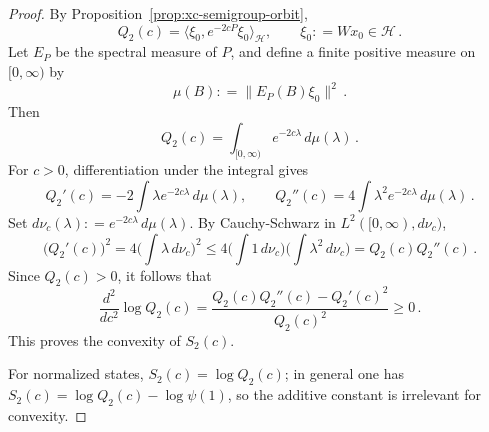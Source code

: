 \documentclass[11pt,a4paper]{article}
\theoremstyle{plain}
\numberwithin{theorem}{section}
\theoremstyle{definition}
\newcommand{\?}{\overset{?}{=}}
\newcommand{\defeq}{\mathrel{\mathop:}=}
\begin{document}
\begin{appendix}
\begin{proof}
By Proposition~\ref{prop:xc-semigroup-orbit},
\[
Q_2(c) = \langle \xi_0, e^{-2cP}\xi_0\rangle_{\mathcal H},
\qquad
\xi_0  \defeq  W x_0 \in \mathcal H\,. 
\]
Let \(E_P\) be the spectral measure of \(P\), and define a finite positive measure on
\([0,\infty)\) by
\[
\mu(B)  \defeq  \|E_P(B)\xi_0\|^2\,.
\]
Then
\[
Q_2(c)=\int_{[0,\infty)} e^{-2c\lambda}\,d\mu(\lambda)\,.
\]
For \(c>0\), differentiation under the integral gives
\[
Q_2'(c) = -2\int \lambda e^{-2c\lambda}\,d\mu(\lambda),
\qquad
Q_2''(c) = 4\int \lambda^2 e^{-2c\lambda}\,d\mu(\lambda)\,.
\]
Set \(d\nu_c(\lambda)  \defeq  e^{-2c\lambda}\,d\mu(\lambda)\). By Cauchy-Schwarz in
\(L^2([0,\infty),d\nu_c)\),
\[
\big(Q_2'(c)\big)^2
=
4\Big(\int \lambda\,d\nu_c\Big)^2
\le
4\Big(\int 1\,d\nu_c\Big)\Big(\int \lambda^2\,d\nu_c\Big)
=
Q_2(c)Q_2''(c)\,.
\]
Since \(Q_2(c)>0\), it follows that
\[
\frac{d^2}{dc^2}\log Q_2(c)
=
\frac{Q_2(c)Q_2''(c)-Q_2'(c)^2}{Q_2(c)^2}
\ge 0\,.
\]
This proves the convexity of \(S_2(c)\).

For normalized states, \(S_2(c) = \log Q_2(c)\); in general one has
\(S_2(c) = \log Q_2(c) - \log \psi(1)\), so the additive constant is irrelevant for convexity.
\end{proof}


\end{appendix}
\end{document}
